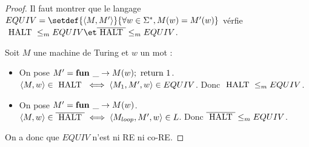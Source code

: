 \begin{proof}
	Il faut montrer que le langage $EQUIV =  \setdef {\encode {M,M'}} {\forall w \in \mots, M(w) = M'(w)}$ vérfie
	$\halt \leqm EQUIV \et \overline{\halt} \leqm EQUIV$.

	Soit $M$ une machine de Turing et $w$ un mot :
	\begin{itemize}
		\item On pose $M' =  \textbf{fun } \_ \rightarrow M(w); \text{ return } 1$. \\
		      $\left\langle M,w\right\rangle \in \text{ HALT } \iff \left\langle M_1, M', w\right\rangle \in EQUIV$. Donc $\text{ HALT } \leq_m EQUIV$.
		\item  On pose $M' =  \textbf{fun } \_ \rightarrow M(w)$. \\
		      $\left\langle M,w\right\rangle \in \overline{\text{ HALT }} \iff \left\langle M_{loop}, M', w\right\rangle \in L$. Donc $\overline{\text{ HALT }} \leq_m EQUIV$.
	\end{itemize}

	On a donc que $EQUIV$ n'est ni RE ni co-RE.
\end{proof}


